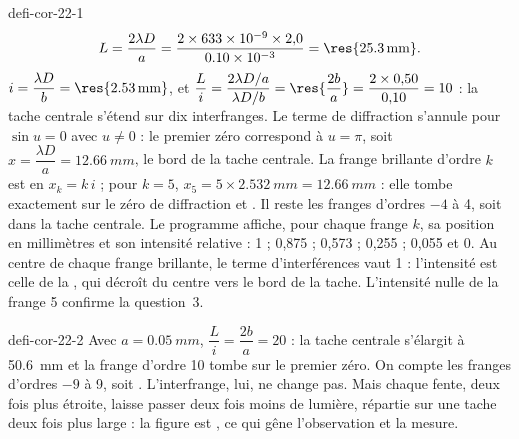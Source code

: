 \begin{blocEdition}{defi-cor-22-1}
\[L=\frac{2\lambda D}{a}=\frac{2\times\num{633e-9}\times2{,}0}{\num{0.10e-3}}=\res{\qty{25,3}{mm}}.\]
$i=\dfrac{\lambda D}{b}=\res{\qty{2,53}{mm}}$, et $\dfrac{L}{i}=\dfrac{2\lambda D/a}{\lambda D/b}=\res{\dfrac{2b}{a}}=\dfrac{2\times0{,}50}{0{,}10}=10$ : la tache
centrale s'étend sur dix interfranges.
Le terme de diffraction s'annule pour $\sin u=0$ avec $u\neq0$ : le premier zéro correspond à $u=\pi$, soit
$x=\dfrac{\lambda D}{a}=\qty{12,66}{mm}$, le bord de la tache centrale. La frange brillante d'ordre $k$ est en $x_k=k\,i$ ; pour
$k=5$, $x_5=5\times\qty{2,532}{mm}=\qty{12,66}{mm}$ : elle tombe exactement sur le zéro de diffraction et .
Il reste les franges d'ordres $-4$ à 4, soit  dans la tache centrale.
Le programme affiche, pour chaque frange $k$, sa position en millimètres et son intensité relative : 1 ; 0,875 ; 0,573 ;
0,255 ; 0,055 et 0. Au centre de chaque frange brillante, le terme d'interférences vaut 1 : l'intensité est celle de la
, qui décroît du centre vers le bord de la tache. L'intensité nulle de la frange 5 confirme la
question~3.
\end{blocEdition}

\begin{blocEdition}{defi-cor-22-2}
\label{figedition-defi-cor-22-2-1}
Avec $a=\qty{0,05}{mm}$, $\dfrac{L}{i}=\dfrac{2b}{a}=20$ : la tache centrale s'élargit à \qty{50,6}{mm} et la frange d'ordre 10 tombe sur
le premier zéro. On compte les franges d'ordres $-9$ à 9, soit . L'interfrange, lui, ne change
pas. Mais chaque fente, deux fois plus étroite, laisse passer deux fois moins de lumière, répartie sur une tache deux
fois plus large : la figure est , ce qui gêne l'observation et la mesure.
\end{blocEdition}

